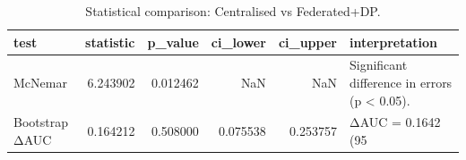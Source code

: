 \begin{table}
\caption{Statistical comparison: Centralised vs Federated+DP.}
\label{tab:stats}
\begin{tabular}{lrrrrl}
\toprule
test & statistic & p_value & ci_lower & ci_upper & interpretation \\
\midrule
McNemar & 6.243902 & 0.012462 & NaN & NaN & Significant difference in errors (p < 0.05). \\
Bootstrap ΔAUC & 0.164212 & 0.508000 & 0.075538 & 0.253757 & ΔAUC = 0.1642 (95%
\bottomrule
\end{tabular}
\end{table}
